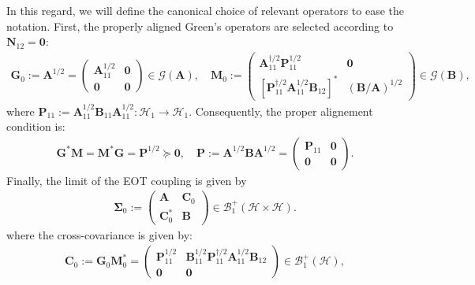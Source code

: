 \documentclass[noinfoline]{imsart}\setcounter{tocdepth}{2}
\newcommand{\m}[1]{\mathbf{#1}}
\renewcommand{\c}[1]{\mathcal{#1}}
\theoremstyle{plain}
\begin{document}
In this regard, we will define the canonical choice of relevant operators to ease the notation. First, the properly aligned Green's operators are selected according to $\m{N}_{{12}} = \m{0}$:
\begin{align}\label{eq:canon:Green}
    \m{G}_{0} := \m{A}^{1/2} = \begin{pmatrix}
    \m{A}_{11}^{1/2} & \m{0} \\
    \m{0} & \m{0}
    \end{pmatrix} \in \c{G}(\m{A}), \quad \m{M}_{0} :=
    \begin{pmatrix}
    \m{A}_{11}^{\dagger/2} \m{P}_{11}^{1/2} & \m{0} \\
    [\m{P}_{11}^{\dagger/2} \m{A}_{{11}}^{1/2} \m{B}_{{12}}]^{*} & (\m{B}/\m{A})^{1/2}
    \end{pmatrix}  \in \c{G}(\m{B}),
\end{align}
where $\m{P}_{11} := \m{A}_{11}^{1/2} \m{B}_{11} \m{A}_{11}^{1/2} : \c{H}_{1} \to \c{H}_{1}$. Consequently, the proper alignement condition is:
\begin{align*}
    \m{G}^{*} \m{M} = \m{M}^{*} \m{G} = \m{P}^{1/2} \succeq \m{0}, \quad \m{P} :=  \m{A}^{1/2} \m{B} \m{A}^{1/2} = \begin{pmatrix}
    \m{P}_{11} & \m{0} \\
    \m{0} & \m{0}
    \end{pmatrix}. 
\end{align*}
Finally, the limit of the EOT coupling is given by
\begin{align*}
    \m{\Sigma}_{0} := 
    \left(
    \begin{array}{c|c}
    \m{A} & \m{C}_{0} \\
    \hline
    \m{C}_{0}^{*} & \m{B}
    \end{array}
    \right) \in \c{B}_{1}^{+}(\c{H} \times \c{H}).
\end{align*}   
where the cross-covariance is given by:
\begin{align}
    \m{C}_{0} := \m{G}_{0} \m{M}_{0}^{*} = \begin{pmatrix}
    \m{P}_{11}^{1/2}  & \m{B}_{11}^{1/2} \m{P}_{11}^{\dagger/2} \m{A}_{{11}}^{1/2} \m{B}_{{12}} \\
    \m{0} & \m{0}
    \end{pmatrix} \in \c{B}_{1}^{+}(\c{H}), \label{eq:limit:OT}
\end{align} 
\end{document}
